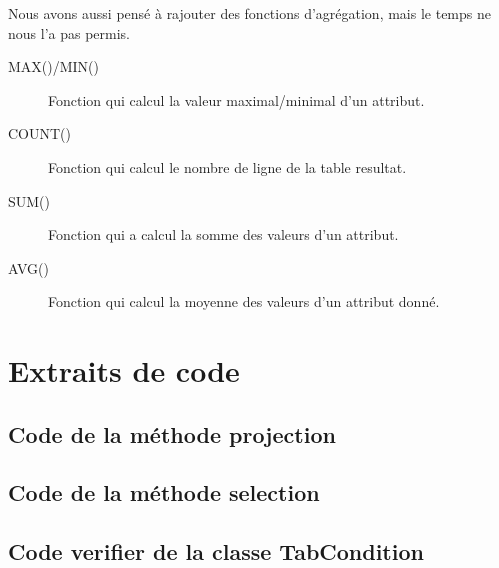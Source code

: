 \documentclass[oneside,13pt,a4paper]{report}
\begin{document}
Nous avons aussi pensé à rajouter des fonctions d'agrégation, mais le temps ne nous l'a pas permis.

\begin{description}
	\item[MAX()/MIN()] Fonction qui calcul la valeur maximal/minimal d'un attribut.
	\item[COUNT()] Fonction qui calcul le nombre de ligne de la table resultat.
	\item[SUM()] Fonction qui a calcul la somme des valeurs d'un attribut.
	\item[AVG()] Fonction qui calcul la moyenne des valeurs d'un attribut donné.
\end{description}


\appendix

\chapter{Extraits de code}

\section{Code de la méthode projection}



\section{Code de la méthode selection}



\section{Code verifier de la classe TabCondition}


\end{document}
